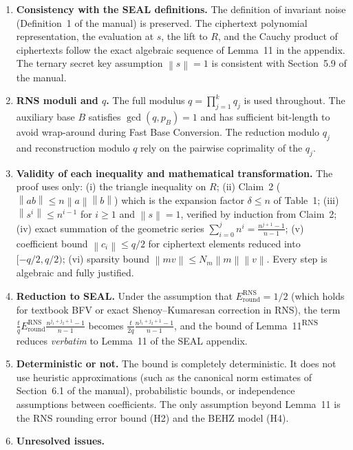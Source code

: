 \documentclass[11pt]{article}
\newcommand{\norm}[1]{\left\lVert #1\right\rVert}
\newcommand{\Sgeo}[1]{\frac{n^{#1+1}-1}{n-1}}            %
\theoremstyle{plain}
\theoremstyle{definition}
\theoremstyle{remark}
\begin{document}
\begin{enumerate}[leftmargin=2em]
\item \textbf{Consistency with the SEAL definitions.}
      The definition of invariant noise (Definition~1 of the manual) is preserved. The ciphertext polynomial
      representation, the evaluation at $s$, the lift to $R$, and the Cauchy product of ciphertexts follow
      the exact algebraic sequence of Lemma~11 in the appendix. The ternary secret key assumption $\norm{s}=1$
      is consistent with Section~5.9 of the manual.
\item \textbf{RNS moduli and $q$.}
      The full modulus $q = \prod_{j=1}^k q_j$ is used throughout. The auxiliary base $B$ satisfies
      $\gcd(q, p_B) = 1$ and has sufficient bit-length to avoid wrap-around during Fast Base Conversion.
      The reduction modulo $q_j$ and reconstruction modulo $q$ rely on the pairwise coprimality of the $q_j$.
\item \textbf{Validity of each inequality and mathematical transformation.}
      The proof uses only:
      (i) the triangle inequality on $R$;
      (ii) Claim~2 ($\norm{ab}\leq n\norm{a}\norm{b}$) which is the expansion factor $\delta\leq n$ of Table~1;
      (iii) $\norm{s^i}\leq n^{i-1}$ for $i\geq 1$ and $\norm{s}=1$, verified by induction from Claim~2;
      (iv) exact summation of the geometric series $\sum_{i=0}^j n^i = \Sgeo{j}$;
      (v) coefficient bound $\norm{c_i}\leq q/2$ for ciphertext elements reduced into $[-q/2, q/2)$;
      (vi) sparsity bound $\norm{mv}\leq N_m\norm{m}\norm{v}$.
      Every step is algebraic and fully justified.
\item \textbf{Reduction to SEAL.}
      Under the assumption that $E_{\mathrm{round}}^{\mathrm{RNS}} = 1/2$ (which holds for textbook BFV or exact
      Shenoy--Kumaresan correction in RNS), the term $\frac{t}{q}E_{\mathrm{round}}^{\mathrm{RNS}}\Sgeo{j_1+j_2}$
      becomes $\frac{t}{2q}\Sgeo{j_1+j_2}$, and the bound of Lemma~11\textsuperscript{RNS} reduces
      \emph{verbatim} to Lemma~11 of the SEAL appendix.
\item \textbf{Deterministic or not.}
      The bound is completely deterministic. It does not use heuristic approximations (such as the canonical norm
      estimates of Section~6.1 of the manual), probabilistic bounds, or independence assumptions between coefficients.
      The only assumption beyond Lemma~11 is the RNS rounding error bound (H2) and the BEHZ model (H4).
\item \textbf{Unresolved issues.}
      \begin{enumerate}[label=(\alph*)]

\end{enumerate}
\end{enumerate}
\end{document}
